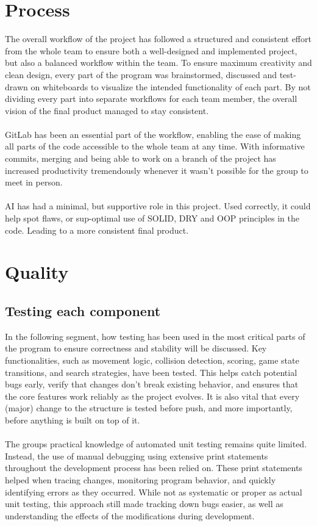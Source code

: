 \documentclass[a4paper,5pt]{article}
\begin{document}
\newpage
\section{Process}
The overall workflow of the project has followed a structured and consistent effort from the whole team to ensure both a well-designed and implemented project, but also a balanced workflow within the team. 
To ensure maximum creativity and clean design, every part of the program was brainstormed, discussed and test-drawn on whiteboards to visualize the intended functionality of each part. By not dividing every part into separate workflows for each team member, the overall vision of the final product managed to stay consistent. \\\\
\noindent GitLab has been an essential part of the workflow, enabling the ease of making all parts of the code accessible to the whole team at any time. With informative commits, merging and being able to work on a branch of the project has increased productivity tremendously whenever it wasn’t possible for the group to meet in person.\\\\
AI has had a minimal, but supportive role in this project. Used correctly, it could help spot flaws, or sup-optimal use of SOLID, DRY and OOP principles in the code. Leading to a more consistent final product.

\newpage
\section{Quality}
\subsection{Testing each component}
In the following segment, how testing has been used in the most critical parts of the program to ensure correctness and stability will be discussed. Key functionalities, such as movement logic, collision detection, scoring, game state transitions, and search strategies, have been tested. This helps catch potential bugs early, verify that changes don’t break existing behavior, and ensures that the core features work reliably as the project evolves. It is also vital that every (major) change to the structure is tested before push, and more importantly, before anything is built on top of it.\\\\ The groups practical knowledge of automated unit testing remains quite limited. Instead, the use of manual debugging using extensive print statements throughout the development process has been relied on. These print statements helped when tracing changes, monitoring program behavior, and quickly identifying errors as they occurred. While not as systematic or proper as actual unit testing, this approach still made tracking down bugs easier, as well as understanding the effects of the modifications during development.
\end{document}

